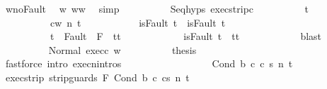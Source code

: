\begin{isabellebody}
\ w{\isacharprime}{\isacharunderscore}noFault\ \isamarkupfalse%
\ w{\isacharprime}{\isacharcolon}\ {\isachardoublequoteopen}w{\isacharprime}{\isacharequal}w{\isachardoublequoteclose}\ \isamarkupfalse%
\ simp\isanewline
\ \ \ \ \ \ \ \ \isamarkupfalse%
\ Seq{\isachardot}hyps\ exec{\isacharunderscore}strip{\isacharunderscore}c{}\isanewline
\ \ \ \ \ \ \ \ \isamarkupfalse%
\ t{\isacharprime}\ \isanewline
\ \ \ \ \ \ \ \ \ \ {\isachardoublequoteopen}{\isasymGamma}{\isasymturnstile}{\isasymlangle}c{}{\isacharcomma}w{\isasymrangle}\ {\isacharequal}n{\isasymRightarrow}\ t{\isacharprime}{\isachardoublequoteclose}\ \isanewline
\ \ \ \ \ \ \ \ \ \ {\isachardoublequoteopen}isFault\ t\ {\isasymlongrightarrow}\ isFault\ t{\isacharprime}{\isachardoublequoteclose}\ \isanewline
\ \ \ \ \ \ \ \ \ \ {\isachardoublequoteopen}t{\isacharprime}\ {\isasymin}\ Fault\ {\isacharbackquote}\ {\isacharparenleft}{\isacharminus}F{\isacharparenright}\ {\isasymlongrightarrow}\ t{\isacharprime}{\isacharequal}t{\isachardoublequoteclose}\ \isanewline
\ \ \ \ \ \ \ \ \ \ {\isachardoublequoteopen}{\isasymnot}\ isFault\ t{\isacharprime}\ {\isasymlongrightarrow}\ t{\isacharprime}{\isacharequal}t{\isachardoublequoteclose}\isanewline
\ \ \ \ \ \ \ \ \ \ \isamarkupfalse%
\ blast\isanewline
\ \ \ \ \ \ \ \ \isamarkupfalse%
\ Normal\ exec{\isacharunderscore}c{}\ w{\isacharprime}\isanewline
\ \ \ \ \ \ \ \ \isamarkupfalse%
\ {\isacharquery}thesis\isanewline
\ \ \ \ \ \ \ \ \ \ \isamarkupfalse%
\ {\isacharparenleft}fastforce\ intro{\isacharcolon}\ execn{\isachardot}intros{\isacharparenright}\isanewline
\ \ \ \ \ \ \isamarkupfalse%
\isanewline
\ \ \ \ \isamarkupfalse%
\isanewline
\ \ \isamarkupfalse%
\isanewline
{}\isamarkupfalse%
\isanewline
{}\isamarkupfalse%
\isanewline
\ \ \isamarkupfalse%
\ {\isacharparenleft}Cond\ b\ c{}\ c{}\ s\ n\ t{\isacharparenright}\isanewline
\ \ \isamarkupfalse%
\ exec{\isacharunderscore}strip{\isacharcolon}\ {\isachardoublequoteopen}{\isasymGamma}{\isasymturnstile}{\isasymlangle}strip{\isacharunderscore}guards\ F\ {\isacharparenleft}Cond\ b\ c{}\ c{}{\isacharparenright}{\isacharcomma}s{\isasymrangle}\ {\isacharequal}n{\isasymRightarrow}\ t{\isachardoublequoteclose}\ \isamarkupfalse%

\end{isabellebody}
